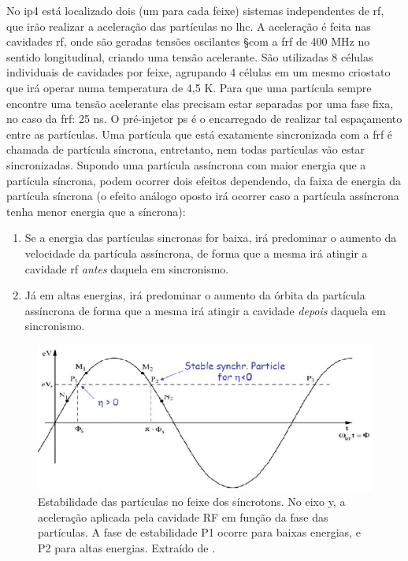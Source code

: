 No \gls{ip}4 está localizado dois (um para cada feixe) sistemas independentes de \gls{rf}, 
que irão realizar a aceleração das partículas no \gls{lhc}. A
aceleração é feita nas cavidades \gls{rf}, onde são geradas tensões oscilantes
§com a \gls{frf} de 400 MHz no sentido longitudinal, criando uma
tensão acelerante. São utilizadas 8 células individuais de cavidades por feixe,
agrupando 4 células em um mesmo criostato que irá operar numa temperatura de 4,5 K.
Para que uma partícula sempre encontre uma tensão
acelerante elas precisam estar separadas por uma fase fixa, no caso da
\gls{frf}: 25 ns. O pré-injetor \acrshort{ps} é o encarregado de
realizar tal espaçamento entre as partículas. Uma partícula que está exatamente
sincronizada com a \gls{frf} é chamada de partícula síncrona, entretanto,
nem todas partículas vão estar sincronizadas. Supondo uma partícula assíncrona com maior
energia que a partícula síncrona, podem ocorrer dois efeitos dependendo, da faixa
de energia da partícula síncrona (o efeito análogo oposto irá 
ocorrer caso a partícula assíncrona tenha menor energia que a síncrona):

\begin{enumerate}
\item Se a energia das partículas sincronas for baixa, irá predominar 
o aumento da velocidade da partícula assíncrona, de forma que a mesma irá
atingir a cavidade \gls{rf} \textit{antes} daquela em sincronismo.
\item Já em altas energias, irá predominar o aumento da órbita da partícula
assíncrona de forma que a mesma irá atingir a cavidade \textit{depois}
daquela em sincronismo.
\end{enumerate}

\begin{figure}[h!t]
\centering
\includegraphics[width=.7\textwidth]{imagens/estabilidade_fase.png}
\caption{Estabilidade das partículas no feixe dos síncrotons. No eixo y, a
aceleração aplicada pela cavidade RF em função da fase das partículas. 
A fase de estabilidade P1 ocorre para baixas energias, e P2 para altas energias. 
Extraído de \cite{lecture_slides_1}.}
\label{fig:est_sinc}
\end{figure}


